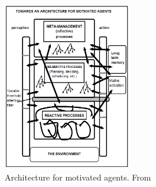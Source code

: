 \begin{figure}[t!]
	\centering
	\includegraphics[width=0.5\textwidth]{Figs/slomanSystem.png}
	\caption{Architecture for motivated agents. From \cite[p.\ 10]{sloman1997}}
	\label{fig:slomanSystem}
\end{figure}

